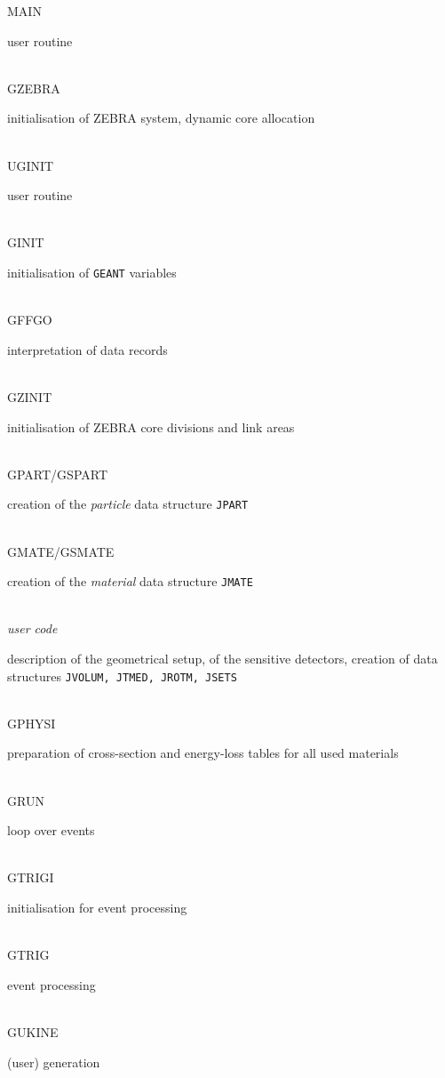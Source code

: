 \begin{tabbing}
MAIN \> \> \> \> \> \> \> \> \> \parbox[t]{7.5cm}{user routine
\vspace{.20cm}} \\
   \> GZEBRA \> \> \> \> \> \> \> \> \parbox[t]{7.5cm}{initialisation of
ZEBRA system, dynamic core allocation \vspace{.20cm}} \\
  \> UGINIT \> \> \> \> \> \> \> \> \parbox[t]{7.5cm}{user routine
\vspace{.20cm}} \\
  \> \> GINIT \> \> \> \> \> \> \> \parbox[t]{7.5cm}{initialisation of
{\tt GEANT} variables \vspace{.20cm}} \\
  \> \> GFFGO \> \> \> \> \> \> \> \parbox[t]{7.5cm}{interpretation of
data records \vspace{.20cm}} \\
  \> \> GZINIT \> \> \> \> \> \> \> \parbox[t]{7.5cm}{initialisation of
ZEBRA core divisions and link areas \vspace{.20cm}} \\
  \> \> GPART/GSPART \> \> \> \> \> \> \> \parbox[t]{7.5cm}{creation of the
{\em particle} data structure {\tt JPART} \vspace{.20cm}} \\
  \> \> GMATE/GSMATE \> \> \> \> \> \> \> \parbox[t]{7.5cm}{creation of the {\em
material} \vspace{.20cm} data structure {\tt JMATE} } \\
  \> \> {\em user code} \> \> \> \> \> \> \> \parbox[t]{7.5cm}{description
of the geometrical setup, of the sensitive detectors,
creation of data structures
{\tt JVOLUM, JTMED, JROTM, JSETS} \vspace{.20cm}} \\
  \> \> GPHYSI \> \> \> \> \> \> \> \parbox[t]{7.5cm}{preparation of
cross-section and energy-loss tables for all used materials \vspace{.20cm}} \\
  \> GRUN \> \> \> \> \> \> \> \> \parbox[t]{7.5cm}{loop over events
\vspace{.20cm}} \\
  \> \> GTRIGI \> \> \> \> \> \> \> \parbox[t]{7.5cm}{initialisation for
event processing \vspace{.20cm}} \\
  \> \> GTRIG \> \> \> \> \> \> \> \parbox[t]{7.5cm}{event processing
\vspace{.20cm}} \\
  \> \> \> GUKINE \> \> \> \> \> \> \parbox[t]{7.5cm}{(user)  generation
}
\end{tabbing}

